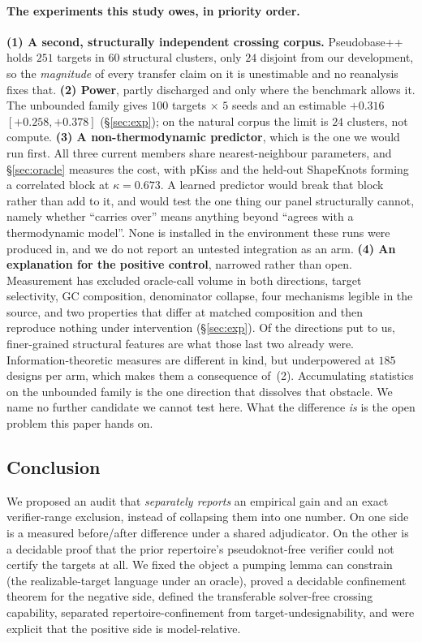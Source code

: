 \documentclass[11pt]{article}
\begin{document}
\paragraph{The experiments this study owes, in priority order.} \textbf{(1) A second, structurally
independent crossing corpus.} Pseudobase++ holds $251$ targets in $60$ structural clusters, only $24$ disjoint
from our development, so the \emph{magnitude} of every transfer claim on it is unestimable and no reanalysis
fixes that. \textbf{(2) Power}, partly discharged and only where the benchmark allows it. The unbounded family
gives $100$ targets $\times$ $5$ seeds and an estimable ${+}0.316$ $[{+}0.258,{+}0.378]$ (\S\ref{sec:exp});
on the natural corpus the limit is $24$ clusters, not compute. \textbf{(3) A non-thermodynamic predictor},
which is the one we would run first. All three current members share nearest-neighbour parameters, and
\S\ref{sec:oracle} measures the cost, with pKiss and the held-out ShapeKnots forming a correlated block at
$\kappa=0.673$. A learned predictor would break that block rather than add to it, and would test the one thing
our panel structurally cannot, namely whether ``carries over'' means anything beyond ``agrees with a
thermodynamic model''. None is installed in the environment these runs were produced in, and we do not report
an untested integration as an arm. \textbf{(4) An explanation for the positive control}, narrowed rather than
open. Measurement has excluded oracle-call volume in both directions, target selectivity, GC composition,
denominator collapse, four mechanisms legible in the source, and two properties that differ at matched
composition and then reproduce nothing under intervention (\S\ref{sec:exp}). Of the directions put to us, finer-grained structural features are what those last two already were.
Information-theoretic measures are different in kind, but underpowered at $185$ designs per arm, which makes
them a consequence of~(2). Accumulating statistics on the unbounded family is the one direction that dissolves
that obstacle. We name no further
candidate we cannot test here. What the difference \emph{is} is the open problem this paper hands on.

\subsection{Conclusion}\label{sec:conclusion}
We proposed an audit that \emph{separately reports} an empirical gain and an exact verifier-range exclusion,
instead of collapsing them into one number. On one side is a measured before/after difference under a shared
adjudicator. On the other is a decidable proof that the prior repertoire's pseudoknot-free verifier could not
certify the targets at all. We fixed the object a pumping lemma can constrain (the realizable-target language under an oracle),
proved a decidable confinement theorem for the negative side, defined the transferable solver-free crossing
capability, separated repertoire-confinement from target-undesignability, and were explicit that the positive
side is model-relative.
\end{document}
